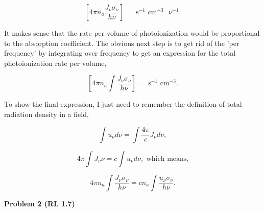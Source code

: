 \documentclass[12pt]{article}
\begin{document}
\begin{equation}
\left[ 4\pi n_a \frac{J_\nu \sigma_\nu}{h\nu} \right] = \text{ s}^{-1} \text{ cm}^{-3}  \text{ }\nu^{-1}.
\end{equation}

\noindent It makes sense that the rate per volume of photoionization would be proportional to the absorption coefficient. The obvious next step is to get rid of the 'per frequency' by integrating over frequency to get an expression for the total photoionization rate per volume,

\begin{equation}
\left[ 4\pi n_a \int \frac{J_\nu \sigma_\nu}{h\nu} \right] = \text{ s}^{-1} \text{ cm}^{-3}  .
\end{equation}

\noindent To show the final expression, I just need to remember the definition of total radiation density in a field,

\begin{equation}
\int u_\nu d\nu = \int \frac{4\pi}{c} J_\nu d\nu, 
\end{equation}

\begin{equation}
4\pi\int J_\nu \nu = c\int u_\nu d\nu, \text{ which means,}
\end{equation}

\begin{equation}
4\pi n_a \int \frac{J_\nu \sigma_\nu}{h\nu} = cn_a \int \frac{u_\nu \sigma_\nu}{h\nu}.
\end{equation}

\noindent \textbf{Problem 2 (RL 1.7)} 
\end{document}
